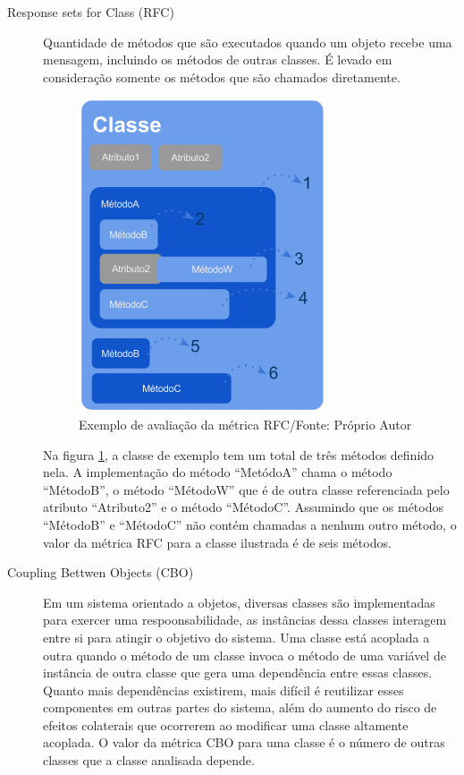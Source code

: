 \begin{description}

\item[Response sets for Class (RFC)] Quantidade de métodos que são executados
quando um objeto recebe uma mensagem, incluindo os métodos de outras classes. É
levado em consideração somente os métodos que são chamados diretamente.

\begin{figure}[!ht]
	\centering
	\includegraphics[scale=0.6]{img/pic_rfc.png}
	\caption{Exemplo de avaliação da métrica RFC/Fonte: Próprio Autor}
	\label{fig:pic_rfc}
\end{figure}

Na figura \ref{fig:pic_rfc}, a classe de exemplo tem um total de três métodos
definido nela. A implementação do método ``MetódoA'' chama o método ``MétodoB'',
o método ``MétodoW'' que é de outra classe referenciada pelo atributo
``Atributo2'' e o método ``MétodoC''. Assumindo que os métodos ``MétodoB'' e
``MétodoC'' não contém chamadas a nenhum outro método, o valor da métrica RFC
para a classe ilustrada é de seis métodos.

\item[Coupling Bettwen Objects (CBO)]  Em um sistema orientado a objetos,
diversas classes são implementadas para exercer uma respoonsabilidade, as
instâncias dessa classes interagem entre si para atingir o objetivo do sistema.
Uma classe está acoplada a outra quando o método de um classe invoca o método de
uma variável de instância de outra classe que gera uma dependência entre essas
classes. Quanto mais dependências existirem, mais difícil é reutilizar esses
componentes em outras partes do sistema, além do aumento do risco de efeitos
colaterais que ocorrerem ao modificar uma classe altamente acoplada. O valor da
métrica CBO para uma classe é o número de outras classes que a classe analisada
depende.


\end{description}
